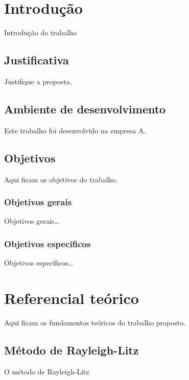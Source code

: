 \documentclass[12pt,oneside,english,brazil,lmodern]{ucsmonograph}
\begin{document}
	\tableofcontents*
	
	\textual %
	
	\chapter{Introdução}
	Introdução do trabalho
	
	\section{Justificativa}
	Justifique a proposta.
	
	\section{Ambiente de desenvolvimento}
	Este trabalho foi desenvolvido na empresa A.
	
	\section{Objetivos}
	Aqui ficam os objetivos do trabalho.
	
	\subsection{Objetivos gerais}
	Objetivos gerais\dots
	
	\subsection{Objetivos específicos}
	Objetivos específicos\dots
	
	\chapter{Referencial teórico}
	Aqui ficam os fundamentos teóricos do trabalho proposto.
	
	\section{Método de Rayleigh-Litz}
	O método de Rayleigh-Litz
	
\end{document}
